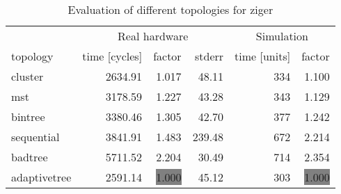 \begin{table}[htb]
  \centering
  \begin{tabular}{lrrrrr}
  \toprule
  & \multicolumn{3}{c}{Real hardware} & \multicolumn{2}{c}{Simulation} \\
  topology & time [cycles] & factor & stderr & time [units] & factor \\
  \midrule
  cluster & 2634.91 & 1.017 & 48.11 & 334 & 1.100 \\
  mst & 3178.59 & 1.227 & 43.28 & 343 & 1.129 \\
  bintree & 3380.46 & 1.305 & 42.70 & 377 & 1.242 \\
  sequential & 3841.91 & 1.483 & 239.48 & 672 & 2.214 \\
  badtree & 5711.52 & 2.204 & 30.49 & 714 & 2.354 \\
  adaptivetree & 2591.14 & \colorbox{gray}{1.000} & 45.12 & 303 & \colorbox{gray}{1.000} \\
  \midrule
  \end{tabular}
  \caption{Evaluation of different topologies for ziger}
  \label{tab:ziger}
\end{table}
